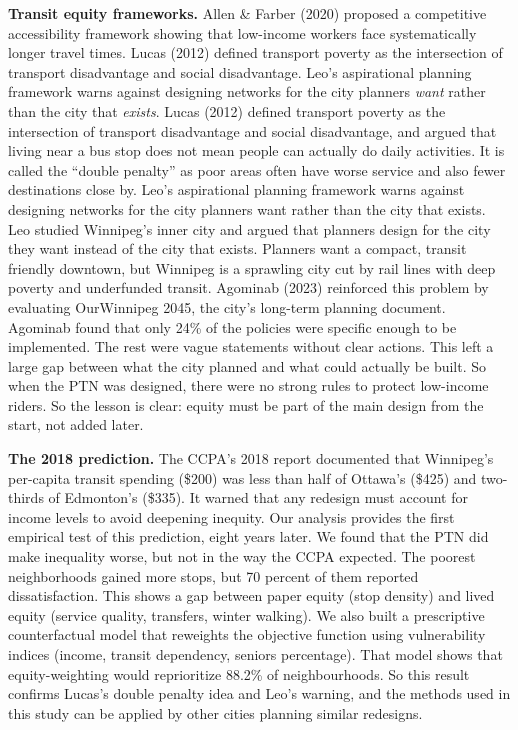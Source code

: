 \documentclass[11pt]{article}
\begin{document}
\textbf{Transit equity frameworks.} Allen \& Farber (2020) proposed a competitive accessibility framework showing that low-income workers face systematically longer travel times. Lucas (2012) defined transport poverty as the intersection of transport disadvantage and social disadvantage. Leo's aspirational planning framework warns against designing networks for the city planners \emph{want} rather than the city that \emph{exists}. Lucas (2012) defined transport poverty as the intersection of transport disadvantage and social disadvantage, and argued that living near a bus stop does not mean people can actually do daily activities. It is called the ``double penalty'' as poor areas often have worse service and also fewer destinations close by. Leo's aspirational planning framework warns against designing networks for the city planners want rather than the city that exists. Leo studied Winnipeg's inner city and argued that planners design for the city they want instead of the city that exists. Planners want a compact, transit friendly downtown, but Winnipeg is a sprawling city cut by rail lines with deep poverty and underfunded transit. Agominab (2023) reinforced this problem by evaluating OurWinnipeg 2045, the city's long-term planning document. Agominab found that only 24\% of the policies were specific enough to be implemented. The rest were vague statements without clear actions. This left a large gap between what the city planned and what could actually be built. So when the PTN was designed, there were no strong rules to protect low-income riders. So the lesson is clear: equity must be part of the main design from the start, not added later.

\textbf{The 2018 prediction.} The CCPA's 2018 report documented that Winnipeg's per-capita transit spending (\$200) was less than half of Ottawa's (\$425) and two-thirds of Edmonton's (\$335). It warned that any redesign must account for income levels to avoid deepening inequity. Our analysis provides the first empirical test of this prediction, eight years later. We found that the PTN did make inequality worse, but not in the way the CCPA expected. The poorest neighborhoods gained more stops, but 70 percent of them reported dissatisfaction. This shows a gap between paper equity (stop density) and lived equity (service quality, transfers, winter walking). We also built a prescriptive counterfactual model that reweights the objective function using vulnerability indices (income, transit dependency, seniors percentage). That model shows that equity-weighting would reprioritize 88.2\% of neighbourhoods. So this result confirms Lucas's double penalty idea and Leo's warning, and the methods used in this study can be applied by other cities planning similar redesigns.
\end{document}
